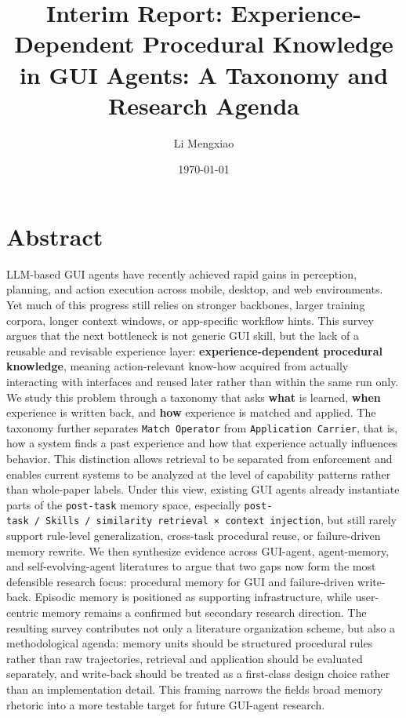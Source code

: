\documentclass{article}
\title{Interim Report: Experience-Dependent Procedural Knowledge in GUI Agents: A Taxonomy and Research Agenda}
\author{Li Mengxiao}
\date{\today}
\begin{document}
\maketitle
\tableofcontents
\newpage

\section*{Abstract}

LLM-based GUI agents have recently achieved rapid gains in perception,
planning, and action execution across mobile, desktop, and web
environments. Yet much of this progress still relies on stronger
backbones, larger training corpora, longer context windows, or
app-specific workflow hints. This survey argues that the next bottleneck
is not generic GUI skill, but the lack of a reusable and revisable
experience layer: \textbf{experience-dependent procedural knowledge},
meaning action-relevant know-how acquired from actually interacting with
interfaces and reused later rather than within the same run only. We
study this problem through a taxonomy that asks \textbf{what} is
learned, \textbf{when} experience is written back, and \textbf{how}
experience is matched and applied. The taxonomy further separates
\texttt{Match\ Operator} from \texttt{Application\ Carrier}, that is,
how a system finds a past experience and how that experience actually
influences behavior. This distinction allows retrieval to be separated
from enforcement and enables current systems to be analyzed at the level
of capability patterns rather than whole-paper labels. Under this view,
existing GUI agents already instantiate parts of the \texttt{post-task}
memory space, especially
\texttt{post-task\ /\ Skills\ /\ similarity\ retrieval\ ×\ context\ injection},
but still rarely support rule-level generalization, cross-task
procedural reuse, or failure-driven memory rewrite. We then synthesize
evidence across GUI-agent, agent-memory, and self-evolving-agent
literatures to argue that two gaps now form the most defensible research
focus: procedural memory for GUI and failure-driven write-back. Episodic
memory is positioned as supporting infrastructure, while user-centric
memory remains a confirmed but secondary research direction. The
resulting survey contributes not only a literature organization scheme,
but also a methodological agenda: memory units should be structured
procedural rules rather than raw trajectories, retrieval and application
should be evaluated separately, and write-back should be treated as a
first-class design choice rather than an implementation detail. This
framing narrows the field\textquotesingle s broad memory rhetoric into a
more testable target for future GUI-agent research.
\end{document}
